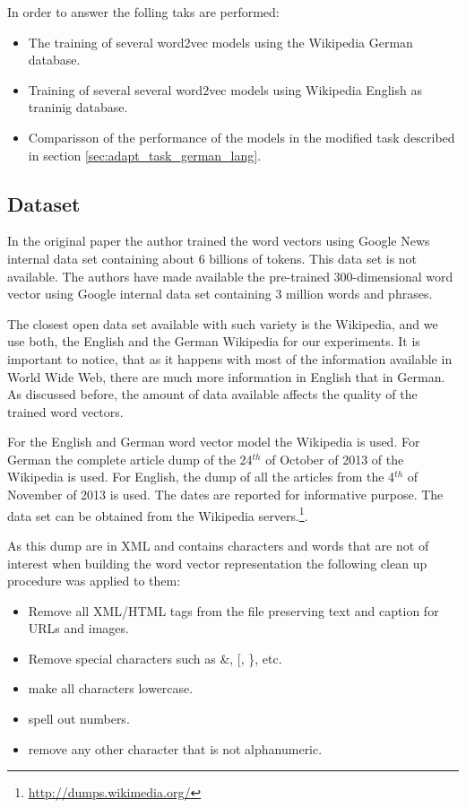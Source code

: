 In order to answer the folling taks are performed:

\begin{itemize}
\item The training of several word2vec models using the Wikipedia German
  database.
\item Training of several several word2vec models using Wikipedia English as
  traninig  database.
\item Comparisson of the performance of the models in the modified task
  described in section \ref{sec:adapt_task_german_lang}.
\end{itemize}


\subsection{Dataset}
\label{experiments:sub:dataset}

In the original paper \cite{DBLP:journals/corr/abs-1301-3781} the author
trained the word vectors using Google News internal data set containing about
6 billions of tokens. This data set is not available. The authors have made
available the pre-trained 300-dimensional  word vector  using Google internal
data set containing 3 million words and phrases.

The closest open data set available with such variety is the Wikipedia, and
we use both, the English and the German Wikipedia for our experiments.  It is
important to notice, that as it happens with most of the information
available in World Wide Web, there are much more information in English that
in German.  As discussed before, the amount of data available affects the quality  of the trained
word vectors. 

For the English and German word vector model  the Wikipedia is used. For
German the complete article dump of the 24$^{th}$ of October of 2013  of the
Wikipedia is used.  For English, the dump of all the articles from the
4$^{th}$ of November of 2013 is used. The dates are reported for informative
purpose. The data set can be obtained from the Wikipedia
servers.\footnote{\url{http://dumps.wikimedia.org/}}.

As this dump are in XML and contains characters and words that are not of
interest when building the word vector  representation the following clean up
procedure was applied to them:

\begin{itemize}
\item Remove all XML/HTML tags from the file preserving text and caption for
 URLs and images.
\item Remove special characters such as \&,  [, \}, etc.
\item make all characters lowercase.
\item spell out numbers.
\item remove any other character that is not alphanumeric.
\end{itemize}

